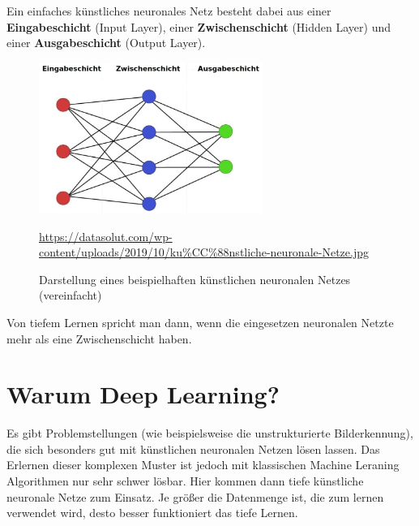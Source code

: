 \newpage

Ein einfaches künstliches neuronales Netz besteht dabei aus einer \textbf{Eingabeschicht} (Input Layer), einer \textbf{Zwischenschicht} (Hidden Layer) und einer \textbf{Ausgabeschicht} (Output Layer). \cite{datasolut2}

\begin{figure}[H]
	\centering
	\includegraphics[width=0.65\textwidth]{kapitel3/images/Simples_Neuronales_Netz.jpg}
	\caption{Darstellung eines beispielhaften künstlichen neuronalen Netzes \\ (vereinfacht)}
	\label{fig:simples-neuronales-netz}
	\vspace{0.2cm}
	\quelle\url{https://datasolut.com/wp-content/uploads/2019/10/ku%CC%88nstliche-neuronale-Netze.jpg}
\end{figure}

Von tiefem Lernen spricht man dann, wenn die eingesetzen neuronalen Netzte mehr als eine Zwischenschicht haben.  \cite{datasolut2} 

\section{Warum Deep Learning?}

Es gibt Problemstellungen (wie beispielsweise die unstrukturierte Bilderkennung), die sich besonders gut mit künstlichen neuronalen Netzen lösen lassen. Das Erlernen dieser komplexen Muster ist jedoch mit klassischen Machine Leraning Algorithmen nur sehr schwer lösbar. Hier kommen dann tiefe künstliche neuronale Netze zum Einsatz. Je größer die Datenmenge ist, die zum lernen verwendet wird, desto besser funktioniert das tiefe Lernen. \cite{datasolut2}

